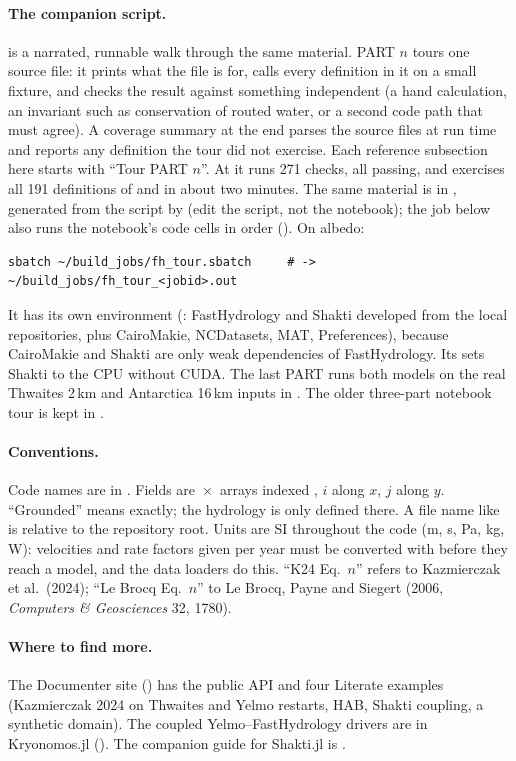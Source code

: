 \paragraph{The companion script.}  is a narrated, runnable walk through the
same material. PART $n$ tours one source file: it prints what the file is for, calls every definition in it on a
small fixture, and checks the result against something independent (a hand calculation, an invariant such as
conservation of routed water, or a second code path that must agree). A coverage summary at the end parses the
source files at run time and reports any definition the tour did not exercise. Each reference subsection here
starts with ``Tour PART $n$''. At  it runs 271 checks, all passing, and exercises all 191 definitions of
 and  in about two minutes. The same material is in , generated from the
script by  (edit the script, not the notebook); the job below also runs the notebook's code cells
in order (). On albedo:
\begin{verbatim}
sbatch ~/build_jobs/fh_tour.sbatch     # -> ~/build_jobs/fh_tour_<jobid>.out
\end{verbatim}
It has its own environment (: FastHydrology and Shakti developed from the
local repositories, plus CairoMakie, NCDatasets, MAT, Preferences), because CairoMakie and Shakti are only weak
dependencies of FastHydrology. Its  sets Shakti to the CPU without CUDA. The last
PART runs both models on the real Thwaites 2\,km and Antarctica 16\,km inputs in
. The older three-part notebook tour is kept in
.

\paragraph{Conventions.} Code names are in . Fields are \,$\times$\, arrays
indexed \code{[i, j]}, $i$ along $x$, $j$ along $y$. ``Grounded'' means  exactly; the hydrology
is only defined there. A file name like  is relative to the repository root. Units are SI
throughout the code (m, s, Pa, kg, W): velocities and rate factors given per year must be converted with
 before they reach a model, and the data loaders do this. ``K24 Eq.~$n$'' refers to
Kazmierczak et al.\ (2024); ``Le Brocq Eq.~$n$'' to Le Brocq, Payne and Siegert (2006, \emph{Computers \&
Geosciences} 32, 1780).

\paragraph{Where to find more.} The Documenter site () has the public API and four Literate examples
(Kazmierczak 2024 on Thwaites and Yelmo restarts, HAB, Shakti coupling, a synthetic domain). The coupled
Yelmo--FastHydrology drivers are in Kryonomos.jl (). The companion guide for
Shakti.jl is .
